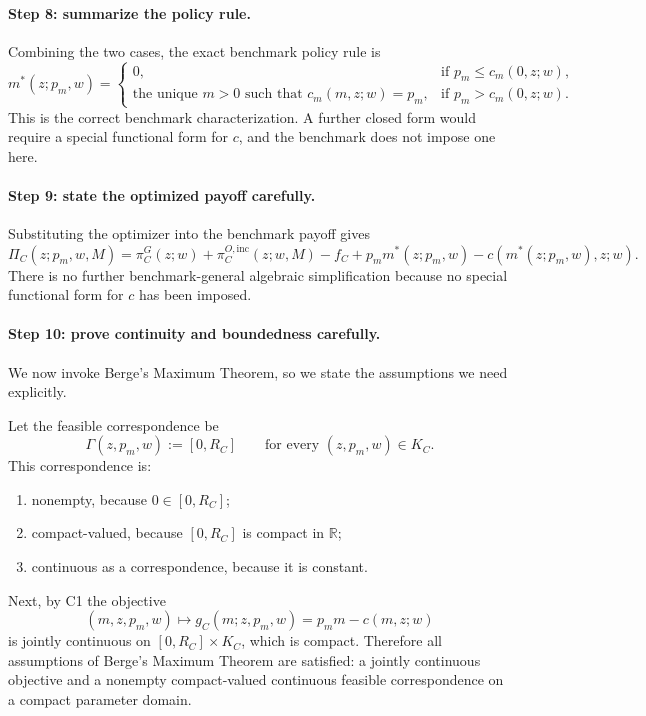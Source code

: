\paragraph{Step 8: summarize the policy rule.}
Combining the two cases, the exact benchmark policy rule is
\begin{equation}
m^*(z;p_m,w)=
\begin{cases}
0, & \text{if } p_m\le c_m(0,z;w),\\[0.4em]
\text{the unique }m>0\text{ such that }c_m(m,z;w)=p_m, & \text{if } p_m>c_m(0,z;w).
\end{cases}
\label{eq:p2C_policy_rev}
\end{equation}
This is the correct benchmark characterization. A further closed form would require a special functional form for $c$, and the benchmark does not impose one here.

\paragraph{Step 9: state the optimized payoff carefully.}
Substituting the optimizer into the benchmark payoff gives
\begin{equation}
\Pi_C(z;p_m,w,M)
=
\pi_C^G(z;w)+\pi_C^{O,\mathrm{inc}}(z;w,M)-f_C
+p_m m^*(z;p_m,w)-c(m^*(z;p_m,w),z;w).
\label{eq:p2C_optimized_payoff_rev}
\end{equation}
There is no further benchmark-general algebraic simplification because no special functional form for $c$ has been imposed.

\paragraph{Step 10: prove continuity and boundedness carefully.}
We now invoke Berge's Maximum Theorem, so we state the assumptions we need explicitly.

Let the feasible correspondence be
\[
\Gamma(z,p_m,w):=[0,R_C]
\qquad\text{for every }(z,p_m,w)\in K_C.
\]
This correspondence is:
\begin{enumerate}
    \item nonempty, because $0\in[0,R_C]$;
    \item compact-valued, because $[0,R_C]$ is compact in $\mathbb R$;
    \item continuous as a correspondence, because it is constant.
\end{enumerate}
Next, by C1 the objective
\[
(m,z,p_m,w)\mapsto g_C(m;z,p_m,w)=p_m m-c(m,z;w)
\]
is jointly continuous on $[0,R_C]\times K_C$, which is compact. Therefore all assumptions of Berge's Maximum Theorem are satisfied: a jointly continuous objective and a nonempty compact-valued continuous feasible correspondence on a compact parameter domain.

